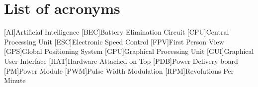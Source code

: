\chapter*{List of acronyms}
\begin{acronym} 
    [AI]{Artificial Intelligence}
    [BEC]{Battery Elimination Circuit}
    [CPU]{Central Processing Unit}
    [ESC]{Electronic Speed Control}
    [FPV]{First Person View}
    [GPS]{Global Positioning System}
    [GPU]{Graphical Processing Unit}
    [GUI]{Graphical User Interface}
    [HAT]{Hardware Attached on Top}
    [PDB]{Power Delivery board}
    [PM]{Power Module}
    [PWM]{Pulse Width Modulation}
    [RPM]{Revolutions Per Minute}
\end{acronym}